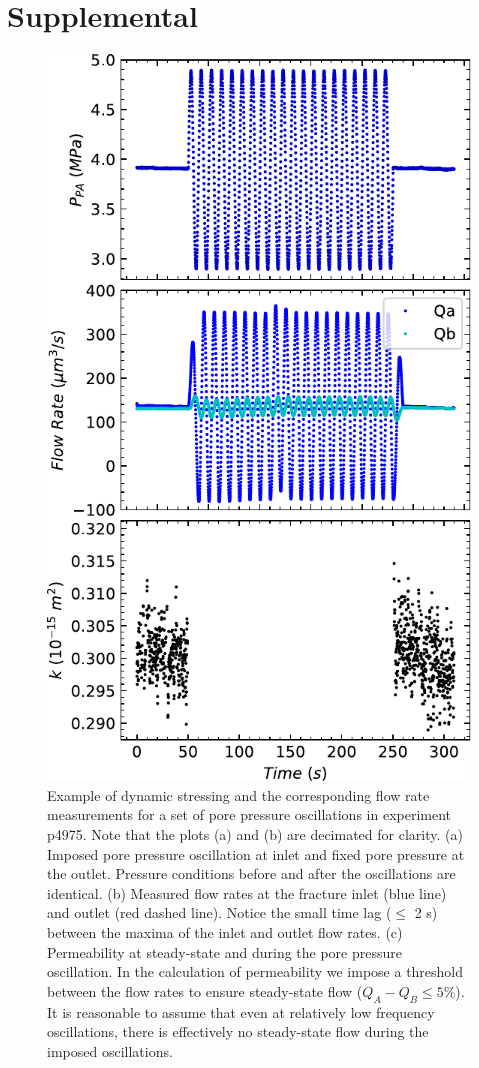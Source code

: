 \documentclass[letterpaper,10pt]{article}
\begin{document}
	
	
	
	
	
	\newcommand{\beginsupplement}{%
		\setcounter{figure}{0}
		\renewcommand{\thefigure}{S\arabic{figure}}%
	}
	
	\beginsupplement
	\section{Supplemental}
	\label{Supp}
	
	\begin{figure}[ht]
		\centering
		\includegraphics[width=0.4\columnwidth]{permCalcPlots_tall_p4975_run3b_1Hz}
		\caption[]{Example of dynamic stressing and the corresponding flow rate measurements for a set of pore pressure oscillations in experiment p4975. Note that the plots (a) and (b) are decimated for clarity. (a) Imposed pore pressure oscillation at inlet and fixed pore pressure at the outlet. Pressure conditions before and after the oscillations are identical. (b) Measured flow rates at the fracture inlet (blue line) and outlet (red dashed line). Notice the small time lag ($\leq$ 2 s) between the maxima of the inlet and outlet flow rates. (c) Permeability at steady-state and during the pore pressure oscillation. In the calculation of permeability we impose a threshold between the flow rates to ensure steady-state flow ($Q_{A} - Q_{B}  \leq 5 \% $). It is reasonable to assume that even at relatively low frequency oscillations, there is effectively no steady-state flow during the imposed oscillations.}
		\label{fig:perm_calc}
	\end{figure}
	
\end{document}
